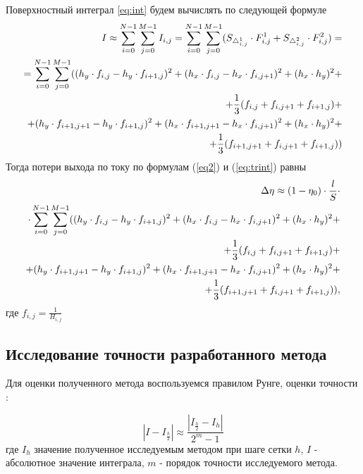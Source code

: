 \documentclass{article}
\begin{document}
Поверхностный интеграл \ref{eq:int} будем вычислять по следующей формуле
\begin{align}\label{eq:trint}
I \approx \sum_{i=0}^{N-1} \sum_{j=0}^{M-1} I_{i,j} = \sum_{i=0}^{N-1} \sum_{j=0}^{M-1} (S_{\triangle_{i,j}^1} \cdot F_{i,j}^1 + S_{\triangle_{i,j}^2} \cdot F_{i,j}^2) = \notag \\
= \sum_{i=0}^{N-1} \sum_{j=0}^{M-1} ((h_y \cdot f_{i,j} - h_y \cdot f_{i+1,j})^2 + (h_x \cdot f_{i,j} - h_x \cdot f_{i,j+1})^2 + (h_x \cdot h_y)^2 + \notag \\
+ \frac{1}{3}(f_{i,j}+f_{i,j+1}+f_{i+1,j}) + \notag \\
+(h_y \cdot f_{i+1,j+1} - h_y \cdot f_{i+1,j})^2 + (h_x \cdot f_{i+1,j+1} - h_x \cdot f_{i,j+1})^2 + (h_x \cdot h_y)^2 + \notag \\
+\frac{1}{3}(f_{i+1,j+1}+f_{i,j+1}+f_{i+1,j}))
\end{align}
Тогда потери выхода по току по формулам (\ref{eq2}) и (\ref{eq:trint}) равны
\begin{align}\label{eq:triang}
\Delta \eta \approx (1- \eta_0) \cdot \frac{l}{S} \cdot \notag \\
\cdot \sum_{i=0}^{N-1} \sum_{j=0}^{M-1} ((h_y \cdot f_{i,j} - h_y \cdot f_{i+1,j})^2 + (h_x \cdot f_{i,j} - h_x \cdot f_{i,j+1})^2 + (h_x \cdot h_y)^2 + \notag \\
+ \frac{1}{3}(f_{i,j}+f_{i,j+1}+f_{i+1,j}) + \notag \\
+(h_y \cdot f_{i+1,j+1} - h_y \cdot f_{i+1,j})^2 + (h_x \cdot f_{i+1,j+1} - h_x \cdot f_{i,j+1})^2 + (h_x \cdot h_y)^2 + \notag \\
+\frac{1}{3}(f_{i+1,j+1}+f_{i,j+1}+f_{i+1,j})),
\end{align}
где $f_{i,j} = \frac{1}{H_{i,j}}$

\subsection{Исследование точности разработанного метода}

Для оценки полученного метода воспользуемся правилом Рунге, оценки точности \cite{litlink:samarskiy}:

\begin{equation}\label{eq:runge1}
|I-I_{\frac{h}{2}}| \approx \frac{|I_{\frac{h}{2}}-I_{h}|}{2^m-1}
\end{equation}
где $I_h$ значение полученное исследуемым методом при шаге сетки $h$, $I$ - абсолютное значение интеграла, $m$ - порядок точности исследуемого метода.
\end{document}
